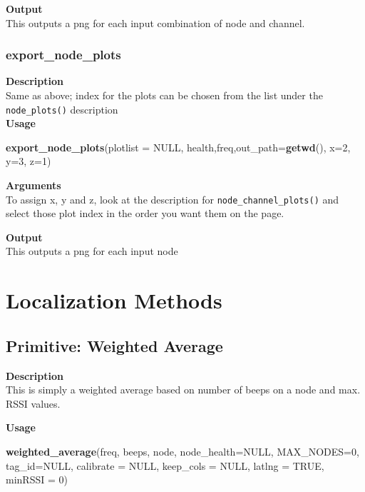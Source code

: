 \documentclass[
]{book}
\newenvironment{Shaded}{\begin{snugshade}}{\end{snugshade}}
\newcommand{\DataTypeTok}[1]{\textcolor[rgb]{0.13,0.29,0.53}{#1}}
\newcommand{\DecValTok}[1]{\textcolor[rgb]{0.00,0.00,0.81}{#1}}
\newcommand{\KeywordTok}[1]{\textcolor[rgb]{0.13,0.29,0.53}{\textbf{#1}}}
\newcommand{\NormalTok}[1]{#1}
\newcommand{\OtherTok}[1]{\textcolor[rgb]{0.56,0.35,0.01}{#1}}
\begin{document}
\textbf{Output}\\
This outputs a png for each input combination of node and channel.

\hypertarget{export_node_plots}{%
\subsection{export\_node\_plots}\label{export_node_plots}}

\textbf{Description}\\
Same as above; index for the plots can be chosen from the list under the \texttt{node\_plots()} description\\
\textbf{Usage}

\begin{Shaded}
\begin{Highlighting}[]
\KeywordTok{export_node_plots}\NormalTok{(}\DataTypeTok{plotlist =} \OtherTok{NULL}\NormalTok{, health,freq,}\DataTypeTok{out_path=}\KeywordTok{getwd}\NormalTok{(), }\DataTypeTok{x=}\DecValTok{2}\NormalTok{, }\DataTypeTok{y=}\DecValTok{3}\NormalTok{, }\DataTypeTok{z=}\DecValTok{1}\NormalTok{)  }
\end{Highlighting}
\end{Shaded}

\textbf{Arguments}\\
To assign x, y and z, look at the description for \texttt{node\_channel\_plots()} and select those plot index in the order you want them on the page.

\textbf{Output}\\
This outputs a png for each input node

\hypertarget{localization-methods}{%
\chapter{Localization Methods}\label{localization-methods}}

\hypertarget{primitive-weighted-average}{%
\section{Primitive: Weighted Average}\label{primitive-weighted-average}}

\textbf{Description}\\
This is simply a weighted average based on number of beeps on a node and max. RSSI values.

\textbf{Usage}

\begin{Shaded}
\begin{Highlighting}[]
\KeywordTok{weighted_average}\NormalTok{(freq, beeps, node, }\DataTypeTok{node_health=}\OtherTok{NULL}\NormalTok{, }\DataTypeTok{MAX_NODES=}\DecValTok{0}\NormalTok{, }\DataTypeTok{tag_id=}\OtherTok{NULL}\NormalTok{, }\DataTypeTok{calibrate =} \OtherTok{NULL}\NormalTok{, }\DataTypeTok{keep_cols =} \OtherTok{NULL}\NormalTok{, }\DataTypeTok{latlng =} \OtherTok{TRUE}\NormalTok{, }\DataTypeTok{minRSSI =} \DecValTok{0}\NormalTok{)}
\end{Highlighting}
\end{Shaded}
\end{document}
